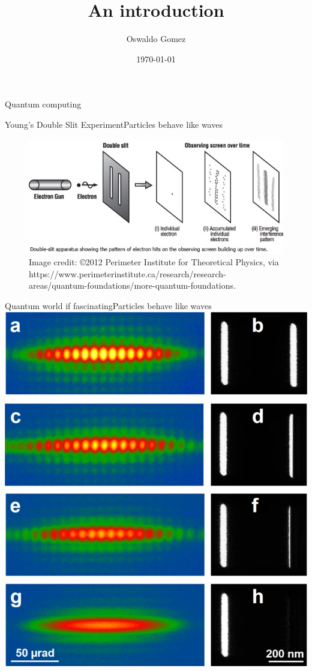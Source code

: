 \documentclass{beamer}
\title[Quantum Computing]{An introduction}
\author{Oswaldo Gomez}
\institute{AI Engineering}
\date{\today}
\begin{document}
\begin{frame}{Quantum computing}
	\titlepage
\end{frame}

\begin{frame}{Young's Double Slit Experiment}{Particles behave like waves}
    \center
    \begin{figure}
    \includegraphics[keepaspectratio=true,width=.8\paperwidth]{.attachments/double-slit.jpeg}
    \caption{Image credit: ©2012 Perimeter Institute for Theoretical Physics, via https://www.perimeterinstitute.ca/research/research-areas/quantum-foundations/more-quantum-foundations.}
    \end{figure}
\end{frame}

\begin{frame}{Quantum world if fascinating}{Particles behave like waves}
	\center
	\includegraphics[keepaspectratio=true,width=.5\paperwidth]{.attachments/young.png}
\end{frame}
\end{document}

